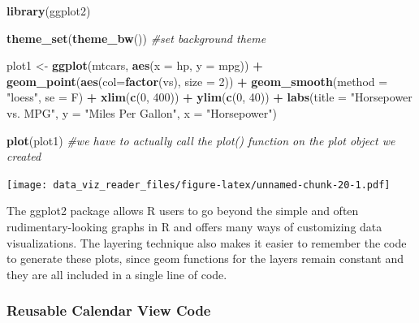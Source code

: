 \documentclass[]{book}
\newenvironment{Shaded}{\begin{snugshade}}{\end{snugshade}}
\newcommand{\KeywordTok}[1]{\textcolor[rgb]{0.13,0.29,0.53}{\textbf{#1}}}
\newcommand{\DataTypeTok}[1]{\textcolor[rgb]{0.13,0.29,0.53}{#1}}
\newcommand{\DecValTok}[1]{\textcolor[rgb]{0.00,0.00,0.81}{#1}}
\newcommand{\StringTok}[1]{\textcolor[rgb]{0.31,0.60,0.02}{#1}}
\newcommand{\CommentTok}[1]{\textcolor[rgb]{0.56,0.35,0.01}{\textit{#1}}}
\newcommand{\OperatorTok}[1]{\textcolor[rgb]{0.81,0.36,0.00}{\textbf{#1}}}
\newcommand{\NormalTok}[1]{#1}
\theoremstyle{definition}
\theoremstyle{definition}
\theoremstyle{definition}
\theoremstyle{remark}
\begin{document}
\begin{Shaded}
\begin{Highlighting}[]
\KeywordTok{library}\NormalTok{(ggplot2)}

\KeywordTok{theme_set}\NormalTok{(}\KeywordTok{theme_bw}\NormalTok{())  }\CommentTok{#set background theme}

\NormalTok{plot1 <-}\StringTok{ }\KeywordTok{ggplot}\NormalTok{(mtcars, }\KeywordTok{aes}\NormalTok{(}\DataTypeTok{x =}\NormalTok{ hp, }\DataTypeTok{y =}\NormalTok{ mpg)) }\OperatorTok{+}\StringTok{ }\KeywordTok{geom_point}\NormalTok{(}\KeywordTok{aes}\NormalTok{(}\DataTypeTok{col=}\KeywordTok{factor}\NormalTok{(vs), }\DataTypeTok{size =} \DecValTok{2}\NormalTok{)) }\OperatorTok{+}\StringTok{ }\KeywordTok{geom_smooth}\NormalTok{(}\DataTypeTok{method =} \StringTok{"loess"}\NormalTok{, }\DataTypeTok{se =}\NormalTok{ F) }\OperatorTok{+}\StringTok{ }\KeywordTok{xlim}\NormalTok{(}\KeywordTok{c}\NormalTok{(}\DecValTok{0}\NormalTok{, }\DecValTok{400}\NormalTok{)) }\OperatorTok{+}\StringTok{ }\KeywordTok{ylim}\NormalTok{(}\KeywordTok{c}\NormalTok{(}\DecValTok{0}\NormalTok{, }\DecValTok{40}\NormalTok{)) }\OperatorTok{+}\StringTok{ }\KeywordTok{labs}\NormalTok{(}\DataTypeTok{title =} \StringTok{"Horsepower vs. MPG"}\NormalTok{, }\DataTypeTok{y =} \StringTok{"Miles Per Gallon"}\NormalTok{, }\DataTypeTok{x =} \StringTok{"Horsepower"}\NormalTok{)}

\KeywordTok{plot}\NormalTok{(plot1)  }\CommentTok{#we have to actually call the plot() function on the plot object we created}
\end{Highlighting}
\end{Shaded}

\texttt{[image: data\_viz\_reader\_files/figure-latex/unnamed-chunk-20-1.pdf]}

The ggplot2 package allows R users to go beyond the simple and often
rudimentary-looking graphs in R and offers many ways of customizing data
visualizations. The layering technique also makes it easier to remember
the code to generate these plots, since geom functions for the layers
remain constant and they are all included in a single line of code.

\subsubsection{Reusable Calendar View
Code}\label{reusable-calendar-view-code}
\end{document}
